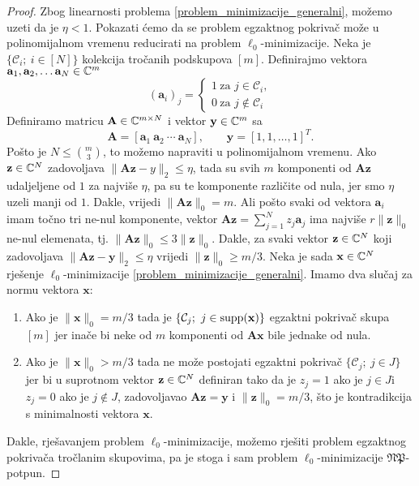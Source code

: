 \documentclass[a4paper,twoside,12pt]{memoir} %
\newcommand{\vect}[1]{\mathbf{#1}}
\renewcommand{\vec}{\vect}
\newcommand{\supp}{\text{\normalfont{supp}}}
\newcommand{\norm}[1]{\|{#1}\|}
\begin{document}
\begin{proof}
    Zbog linearnosti problema \eqref{problem_minimizacije_generalni}, mo\v{z}emo uzeti da je $\eta < 1$. Pokazati \'cemo da se problem egzaktnog pokriva\v{c} mo\v{z}e u polinomijalnom vremenu reducirati na problem $\ell_0$-minimizacije. Neka je $\{\mathcal{C}_i;\ i \in [N]\}$ kolekcija tro\v{c}anih podskupova $[m]$. Definirajmo vektora $\vec a_1, \vec a_2,\dots \vec a_N \in \C^m$
    \begin{equation*}
        (\vec a_i)_j = 
        \begin{cases*}
            1\ \text{za } j \in \mathcal{C}_i,\\
            0\ \text{za } j \not\in \mathcal{C}_i
        \end{cases*}
    \end{equation*}
    Definiramo matricu $\vec A \in \C^{m \times N}$ i vektor $\vec y \in \C^m$ sa
    \begin{equation*}
        \vec A = [\vec a_1\ \vec a_2\ \cdots \ \vec a_N], \qquad \vec y = [1,1, \dots, 1]^T.
    \end{equation*}
    Po\v{s}to je $N \leq {m \choose 3}$, to mo\v{z}emo napraviti u polinomijalnom vremenu. Ako $\vec z \in \C^N$ zadovoljava $\norm{\vec{Az}-y}_2 \leq \eta$, tada su svih $m$ komponenti od $\vec{Az}$ udaljeljene od $1$ za najvi\v{s}e $\eta$, pa su te komponente razli\v{c}ite od nula, jer smo $\eta$ uzeli manji od $1$. Dakle, vrijedi $\norm{\vec{Az}}_0 = m$. Ali po\v{s}to svaki od vektora $\vec a_i$ imam to\v{c}no tri ne-nul komponente, vektor $\vec{Az}=\sum_{j=1}^N z_j \vec a_j$ ima najvi\v{s}e $r \norm{\vec z}_0$ ne-nul elemenata, tj. $\norm{\vec{Az}}_0 \leq 3 \norm{\vec{z}}_0$. Dakle, za svaki vektor $\vec z \in \C^N$ koji zadovoljava $\norm{\vec{Az}-\vec y}_2 \leq \eta$ vrijedi $\norm{\vec z}_0 \geq m/3$. Neka je sada $\vec x \in \C^N$ rje\v{s}enje $\ell_0$-minimizacije \eqref{problem_minimizacije_generalni}. Imamo dva slu\v{c}aj za normu vektora $\vec x$:
    \begin{enumerate}
        \item Ako je $\norm{\vec{x}}_0 = m/3$ tada je $\{\mathcal{C}_j;\ j \in \supp(\vec x)\}$ egzaktni pokriva\v{c} skupa $[m]$ jer ina\v{c}e bi neke od $m$ komponenti od $\vec{Ax}$ bile jednake od nula.
        \item Ako je $\norm{\vec{x}}_0 > m/3$ tada ne mo\v{z}e postojati egzaktni pokriva\v{c} $\{\mathcal{C}_j;\ j \in J\}$ jer bi u suprotnom vektor $\vec z \in \C^N$ definiran tako da je $z_j = 1$ ako je $j \in J$i $z_j = 0$ ako je $j \not \in J$, zadovoljavao $\vec{Az}=\vec y$ i $\norm{\vec z}_0=m/3$, \v{s}to je kontradikcija s minimalnosti vektora $\vec x$.
    \end{enumerate}
    Dakle, rje\v{s}avanjem problem $\ell_0$-minimizacije, mo\v{z}emo rje\v{s}iti problem egzaktnog pokriva\v{c}a tro\v{c}lanim skupovima, pa je stoga i sam problem $\ell_0$-minimizacije $\mathfrak{NP}$-potpun.
\end{proof}
\end{document}

